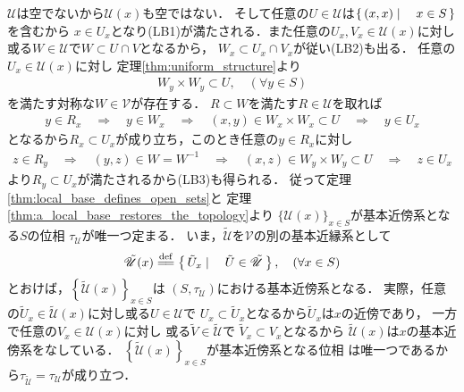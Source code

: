 	\begin{prf}
		$\mathscr{U}$は空でないから$\mathscr{U}(x)$も空ではない．
		そして任意の$U \in \mathscr{U}$は$\left\{\, (x,x) \mid \quad x \in S\, \right\}$を含むから
		$x \in U_x$となり(LB1)が満たされる．また任意の$U_x,V_x \in \mathscr{U}(x)$に対し
		或る$W \in \mathscr{U}$で$W \subset U \cap V$となるから，
		$W_x \subset U_x \cap V_x$が従い(LB2)も出る．
		任意の$U_x \in \mathscr{U}(x)$に対し
		定理\ref{thm:uniform_structure}より
		\begin{align}
			W_y \times W_y \subset U,\quad (\forall y \in S)
		\end{align}
		を満たす対称な$W \in \mathscr{V}$が存在する．
		$R \subset W$を満たす$R \in \mathscr{U}$を取れば
		\begin{align}
			y \in R_x \quad \Longrightarrow \quad
			y \in W_x \quad \Longrightarrow \quad
			(x,y) \in W_x \times W_x \subset U \quad \Longrightarrow \quad
			y \in U_x
		\end{align}
		となるから$R_x \subset U_x$が成り立ち，このとき任意の$y \in R_x$に対し
		\begin{align}
			z \in R_y \quad \Longrightarrow \quad
			(y,z) \in W = W^{-1} \quad \Longrightarrow \quad
			(x,z) \in W_y \times W_y \subset U \quad \Longrightarrow \quad
			z \in U_x
		\end{align}
		より$R_y \subset U_x$が満たされるから(LB3)も得られる．
		従って定理\ref{thm:local_base_defines_open_sets}と
		定理\ref{thm:a_local_base_restores_the_topology}より
		$\{\mathscr{U}(x)\}_{x \in S}$が基本近傍系となる$S$の位相
		$\tau_{\mathscr{U}}$が唯一つ定まる．
		いま，$\tilde{\mathscr{U}}$を$\mathscr{V}$の別の基本近縁系として
		\begin{align}
			\tilde{\mathscr{U}}(x) \defeq \Set{\tilde{U}_x}{\tilde{U} \in \tilde{\mathscr{U}}},
			\quad (\forall x \in S)
		\end{align}
		とおけば，$\left\{\tilde{\mathscr{U}}(x)\right\}_{x \in S}$は
		$(S,\tau_{\mathscr{U}})$における基本近傍系となる．
		実際，任意の$\tilde{U}_x \in \tilde{\mathscr{U}}(x)$に対し或る$U \in \mathscr{U}$で
		$U_x \subset \tilde{U}_x$となるから$\tilde{U}_x$は$x$の近傍であり，
		一方で任意の$V_x \in \mathscr{U}(x)$に対し
		或る$\tilde{V} \in \tilde{\mathscr{U}}$で
		$\tilde{V}_x \subset V_x$となるから
		$\tilde{\mathscr{U}}(x)$は$x$の基本近傍系をなしている．
		$\left\{\tilde{\mathscr{U}}(x)\right\}_{x \in S}$が基本近傍系となる位相
		は唯一つであるから$\tau_{\tilde{\mathscr{U}}} = \tau_{\mathscr{U}}$が成り立つ．
		\QED
	\end{prf}
	
